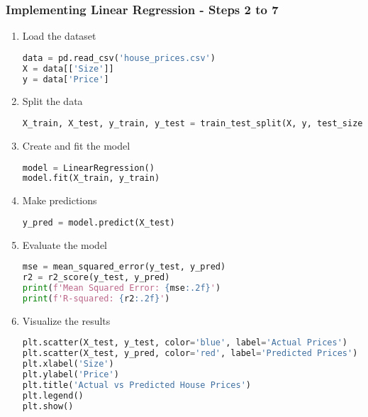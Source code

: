 \documentclass{beamer}
\begin{document}
\begin{frame}[fragile]
    \frametitle{Implementing Linear Regression - Steps 2 to 7}
    \begin{enumerate}
        \item Load the dataset
        \begin{lstlisting}[language=Python]
data = pd.read_csv('house_prices.csv')
X = data[['Size']]
y = data['Price']
        \end{lstlisting}
        
        \item Split the data
        \begin{lstlisting}[language=Python]
X_train, X_test, y_train, y_test = train_test_split(X, y, test_size=0.2, random_state=42)
        \end{lstlisting}
        
        \item Create and fit the model
        \begin{lstlisting}[language=Python]
model = LinearRegression()
model.fit(X_train, y_train)
        \end{lstlisting}
        
        \item Make predictions
        \begin{lstlisting}[language=Python]
y_pred = model.predict(X_test)
        \end{lstlisting}
        
        \item Evaluate the model
        \begin{lstlisting}[language=Python]
mse = mean_squared_error(y_test, y_pred)
r2 = r2_score(y_test, y_pred)
print(f'Mean Squared Error: {mse:.2f}')
print(f'R-squared: {r2:.2f}')
        \end{lstlisting}
        
        \item Visualize the results
        \begin{lstlisting}[language=Python]
plt.scatter(X_test, y_test, color='blue', label='Actual Prices')
plt.scatter(X_test, y_pred, color='red', label='Predicted Prices')
plt.xlabel('Size')
plt.ylabel('Price')
plt.title('Actual vs Predicted House Prices')
plt.legend()
plt.show()
        \end{lstlisting}
    \end{enumerate}
\end{frame}
\end{document}
